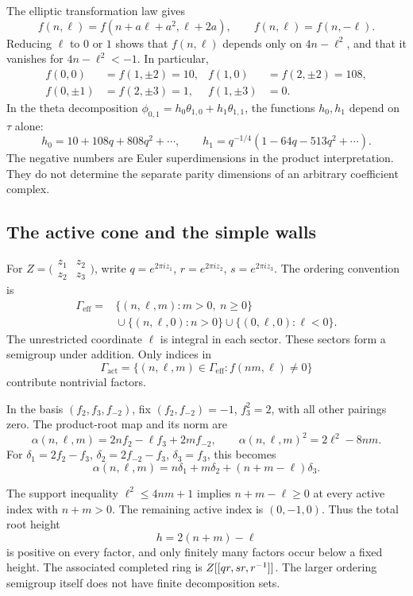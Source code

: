 The elliptic transformation law gives
\[
 f(n,\ell)=f(n+a\ell+a^2,\ell+2a),\qquad
 f(n,\ell)=f(n,-\ell).
\]
Reducing \(\ell\) to \(0\) or \(1\) shows that \(f(n,\ell)\)
depends only on \(4n-\ell^2\), and that it vanishes for
\(4n-\ell^2<-1\).
In particular,
\[
\begin{aligned}
 f(0,0)&=f(1,\pm2)=10,&
 f(1,0)&=f(2,\pm2)=108,\\
 f(0,\pm1)&=f(2,\pm3)=1,&
 f(1,\pm3)&=0.
\end{aligned}
\]
In the theta decomposition
\(\phi_{0,1}=h_0\theta_{1,0}+h_1\theta_{1,1}\),
the functions \(h_0,h_1\) depend on \(\tau\) alone:
\[
 h_0=10+108q+808q^2+\cdots,\qquad
 h_1=q^{-1/4}(1-64q-513q^2+\cdots).
\]
The negative numbers are Euler superdimensions in the product
interpretation.  They do not determine the separate parity dimensions
of an arbitrary coefficient complex.

\subsection{The active cone and the simple walls}

For
\(Z=\bigl(\begin{smallmatrix}z_1&z_2\\z_2&z_3\end{smallmatrix}\bigr)\),
write \(q=e^{2\pi iz_1}\), \(r=e^{2\pi iz_2}\),
\(s=e^{2\pi iz_3}\).  The ordering convention is
\[
\begin{split}
 \Gamma_{\mathrm{eff}}={}&
 \{(n,\ell,m):m>0,\ n\geq0\}\\
 &{}\cup\{(n,\ell,0):n>0\}
 \cup\{(0,\ell,0):\ell<0\}.
\end{split}
\]
The unrestricted coordinate \(\ell\) is integral in each sector.
These sectors form a semigroup under addition.
Only indices in
\[
 \Gamma_{\mathrm{act}}
 =\{(n,\ell,m)\in\Gamma_{\mathrm{eff}}:f(nm,\ell)\ne0\}
\]
contribute nontrivial factors.

In the basis \((f_2,f_3,f_{-2})\), fix
\((f_2,f_{-2})=-1\), \(f_3^2=2\), with all other pairings zero.
The product-root map and its norm are
\[
 \alpha(n,\ell,m)=2nf_2-\ell f_3+2mf_{-2},\qquad
 \alpha(n,\ell,m)^2=2\ell^2-8nm.
\]
For
\(\delta_1=2f_2-f_3\), \(\delta_2=2f_{-2}-f_3\),
\(\delta_3=f_3\), this becomes
\[
 \alpha(n,\ell,m)
 =n\delta_1+m\delta_2+(n+m-\ell)\delta_3.
\]

The support inequality \(\ell^2\leq4nm+1\) implies
\(n+m-\ell\geq0\) at every active index with \(n+m>0\).
The remaining active index is \((0,-1,0)\).
Thus the total root height
\[
 h=2(n+m)-\ell
\]
is positive on every factor, and only finitely many factors occur
below a fixed height.  The associated completed ring is
\(Z[[qr,sr,r^{-1}]]\).
The larger ordering semigroup itself does not have finite
decomposition sets.

